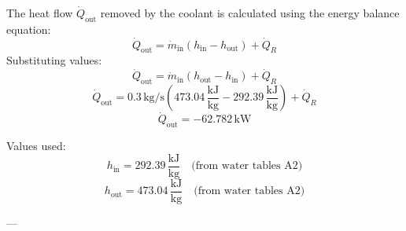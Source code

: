 The heat flow \( \dot{Q}_{\text{out}} \) removed by the coolant is calculated using the energy balance equation:  
\[
\dot{Q}_{\text{out}} = \dot{m}_{\text{in}} \left( h_{\text{in}} - h_{\text{out}} \right) + \dot{Q}_R
\]  
Substituting values:  
\[
\dot{Q}_{\text{out}} = \dot{m}_{\text{in}} \left( h_{\text{out}} - h_{\text{in}} \right) + \dot{Q}_R
\]  
\[
\dot{Q}_{\text{out}} = 0.3 \, \text{kg/s} \left( 473.04 \, \frac{\text{kJ}}{\text{kg}} - 292.39 \, \frac{\text{kJ}}{\text{kg}} \right) + \dot{Q}_R
\]  
\[
\dot{Q}_{\text{out}} = -62.782 \, \text{kW}
\]  

Values used:  
\[
h_{\text{in}} = 292.39 \, \frac{\text{kJ}}{\text{kg}} \quad \text{(from water tables A2)}
\]  
\[
h_{\text{out}} = 473.04 \, \frac{\text{kJ}}{\text{kg}} \quad \text{(from water tables A2)}
\]  

---